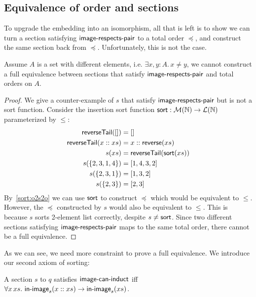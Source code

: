 \subsection{Equivalence of order and sections}
To upgrade the embedding into an isomorphism, all that is left
is to show we can turn a section satisfying $\operatorname{\mathsf{image-respects-pair}}$ to a total order $\preccurlyeq$, and construct the
same section back from $\preccurlyeq$. Unfortunately, this is not the case.

\begin{proposition}
    Assume $A$ is a set with different elements, i.e. $\exists x, y: A.\,x \neq y$,
    we cannot construct a full equivalence between sections that satisfy $\operatorname{\mathsf{image-respects-pair}}$
    and total orders on $A$.
\end{proposition}

\begin{proof}
    We give a counter-example of $s$ that satisfy $\operatorname{\mathsf{image-respects-pair}}$ but is not a sort function.
    Consider the insertion sort function $\operatorname{\mathsf{sort}} : \mathcal{M}(\mathbb{N}) \to \mathcal{L}(\mathbb{N})$
    parameterized by $\leq$:
    \begin{align*}
    \operatorname{\mathsf{reverseTail}}([]) & = [] \\
    \operatorname{\mathsf{reverseTail}}(x :: xs) & = x :: \operatorname{\mathsf{reverse}}(xs) \\
    s(xs) & = \operatorname{\mathsf{reverseTail}}(\operatorname{\mathsf{sort}}(xs)) \\
    s(\{2,3,1,4\}) & = [1,4,3,2] \\
    s(\{2,3,1\}) & = [1, 3, 2] \\
    s(\{2,3\}) & = [2, 3] \\
    \end{align*}
    By~\ref{sort:o2s2o} we can use $\operatorname{\mathsf{sort}}$ to construct $\preccurlyeq$ which would be
    equivalent to $\leq$. However, the $\preccurlyeq$ constructed by $s$ would also be equivalent
    to $\leq$. This is because $s$ sorts 2-element list correctly, despite $s \neq \operatorname{\mathsf{sort}}$.
    Since two different sections satisfying $\operatorname{\mathsf{image-respects-pair}}$ maps to the same total order,
    there cannot be a full equivalence.
\end{proof}

As we can see, we need more constraint to prove a full equivalence.
We introduce our second axiom of sorting:
\begin{definition}
    A section $s$ to $q$ satisfies $\operatorname{\mathsf{image-can-induct}}$ iff
    $\forall x\,xs.\,\operatorname{\mathsf{in-image}}_s(x :: xs) \to \operatorname{\mathsf{in-image}}_s(xs)$.
\end{definition}

